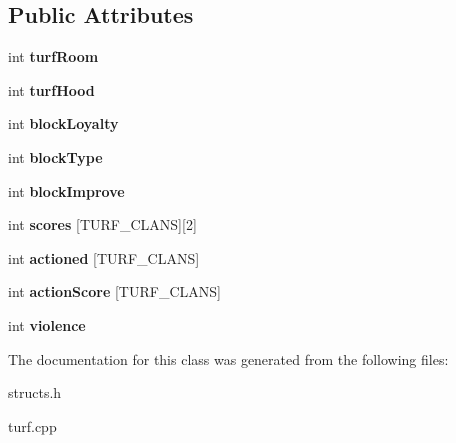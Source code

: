 \subsection*{Public Attributes}
\begin{DoxyCompactItemize}
\item 
\hypertarget{classBlock_a7d080c6c349d17e582d63405d40ba4b7}{int {\bfseries turf\-Room}}\label{classBlock_a7d080c6c349d17e582d63405d40ba4b7}

\item 
\hypertarget{classBlock_a174ece7b61ffa487286bdd2fc487c510}{int {\bfseries turf\-Hood}}\label{classBlock_a174ece7b61ffa487286bdd2fc487c510}

\item 
\hypertarget{classBlock_a70dbb5221f0c068954a6d43b72a54eca}{int {\bfseries block\-Loyalty}}\label{classBlock_a70dbb5221f0c068954a6d43b72a54eca}

\item 
\hypertarget{classBlock_a108050a7570c5c5d1de1b83f42a265dc}{int {\bfseries block\-Type}}\label{classBlock_a108050a7570c5c5d1de1b83f42a265dc}

\item 
\hypertarget{classBlock_ad35fa4c92d80803155062dbd44f53af7}{int {\bfseries block\-Improve}}\label{classBlock_ad35fa4c92d80803155062dbd44f53af7}

\item 
\hypertarget{classBlock_a4d1441123e6e6cc6d12184fc6e639186}{int {\bfseries scores} \mbox{[}T\-U\-R\-F\-\_\-\-C\-L\-A\-N\-S\mbox{]}\mbox{[}2\mbox{]}}\label{classBlock_a4d1441123e6e6cc6d12184fc6e639186}

\item 
\hypertarget{classBlock_ab23e6326ffa446b8879cff0a7672dd9a}{int {\bfseries actioned} \mbox{[}T\-U\-R\-F\-\_\-\-C\-L\-A\-N\-S\mbox{]}}\label{classBlock_ab23e6326ffa446b8879cff0a7672dd9a}

\item 
\hypertarget{classBlock_af4947e7e95b6a9a6ad312658f02142f3}{int {\bfseries action\-Score} \mbox{[}T\-U\-R\-F\-\_\-\-C\-L\-A\-N\-S\mbox{]}}\label{classBlock_af4947e7e95b6a9a6ad312658f02142f3}

\item 
\hypertarget{classBlock_ab0df0d90035b29fed825caa9f8008bab}{int {\bfseries violence}}\label{classBlock_ab0df0d90035b29fed825caa9f8008bab}

\end{DoxyCompactItemize}


The documentation for this class was generated from the following files\-:\begin{DoxyCompactItemize}
\item 
structs.\-h\item 
turf.\-cpp\end{DoxyCompactItemize}

